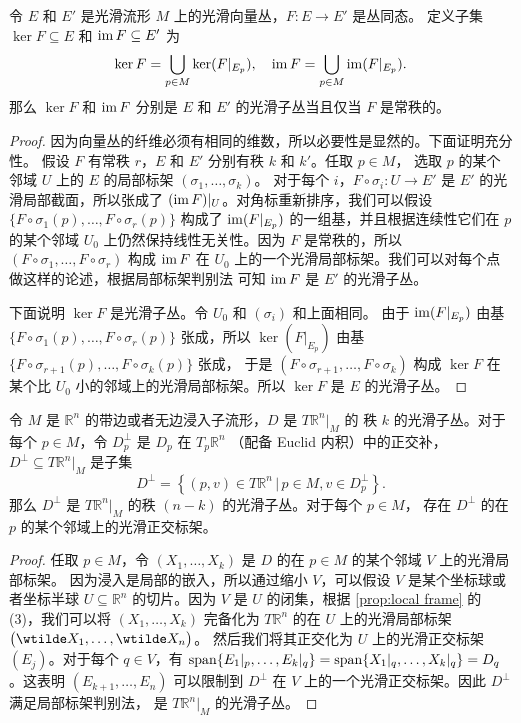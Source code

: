 \begin{theorem}
  令 $E$ 和 $E'$ 是光滑流形 $M$ 上的光滑向量丛，$F:E\to E'$ 是丛同态。
  定义子集 $\ker F\subseteq E$ 和 $\operatorname{im} F\subseteq E'$ 为
  \[
    \ker F=\bigcup_{p\in M} \ker(F|_{E_p}),\quad 
    \operatorname{im} F=\bigcup_{p\in M} \operatorname{im}(F|_{E_p}).
  \]
  那么 $\ker F$ 和 $\operatorname{im} F$ 分别是 $E$ 和 $E'$ 的光滑子丛当且仅当
  $F$ 是常秩的。
\end{theorem}
\begin{proof}
  因为向量丛的纤维必须有相同的维数，所以必要性是显然的。下面证明充分性。
  假设 $F$ 有常秩 $r$，$E$ 和 $E'$ 分别有秩 $k$ 和 $k'$。任取 $p\in M$，
  选取 $p$ 的某个邻域 $U$ 上的 $E$ 的局部标架 $(\sigma_1,\dots,\sigma_k)$。
  对于每个 $i$，$F\circ\sigma_i:U\to E'$ 是 $E'$ 的光滑局部截面，所以张成了
  $(\operatorname{im} F)|_U$。对角标重新排序，我们可以假设 $\bigl\{F\circ \sigma_1(p),\dots,F\circ\sigma_r(p)\bigr\}$
  构成了 $\operatorname{im} (F|_{E_p})$ 的一组基，并且根据连续性它们在 $p$ 的某个邻域
  $U_0$ 上仍然保持线性无关性。因为 $F$ 是常秩的，所以
  $(F\circ\sigma_1,\dots,F\circ\sigma_r)$ 构成 $\operatorname{im} F$ 在 $U_0$
  上的一个光滑局部标架。我们可以对每个点做这样的论述，根据局部标架判别法
  可知 $\operatorname{im} F$ 是 $E'$ 的光滑子丛。

  下面说明 $\ker F$ 是光滑子丛。令 $U_0$ 和 $(\sigma_i)$ 和上面相同。
  由于 $\operatorname{im} (F|_{E_p})$ 由基 $\bigl\{F\circ \sigma_1(p),\dots,F\circ\sigma_r(p)\bigr\}$
  张成，所以 $\ker(F|_{E_p})$ 由基 $\bigl\{F\circ \sigma_{r+1}(p),\dots,F\circ\sigma_k(p)\bigr\}$ 张成，
  于是 $(F\circ\sigma_{r+1},\dots,F\circ\sigma_k)$ 构成 $\ker F$
  在某个比 $U_0$ 小的邻域上的光滑局部标架。所以 $\ker F$
  是 $E$ 的光滑子丛。
\end{proof}

\begin{lemma}[正交补丛]
  令 $M$ 是 $\mathbb{R}^n$ 的带边或者无边浸入子流形，$D$ 是 $T\mathbb R^n|_M$ 的
  秩 $k$ 的光滑子丛。对于每个 $p\in M$，令 $D_p^\bot$ 是 $D_p$ 在 $T_p \mathbb{R}^n$
  （配备 Euclid 内积）中的正交补，$D^\bot\subseteq T \mathbb{R}^n|_M$ 是子集
  \[
    D^\bot=\left\{(p,v)\in T \mathbb{R}^n\,|\, p\in M, v\in D_p^\bot\right\}.
  \] 
  那么 $D^\bot$ 是 $T \mathbb{R}^n|_M$ 的秩 $(n-k)$ 的光滑子丛。对于每个 $p\in M$，
  存在 $D^\bot$ 的在 $p$ 的某个邻域上的光滑正交标架。
\end{lemma}
\begin{proof}
  任取 $p\in M$，令 $(X_1,\dots,X_k)$ 是 $D$ 的在 $p\in M$ 的某个邻域 $V$ 上的光滑局部标架。
  因为浸入是局部的嵌入，所以通过缩小 $V$，可以假设 $V$ 是某个坐标球或者坐标半球 $U\subseteq \mathbb{R}^n$
  的切片。因为 $V$ 是 $U$ 的闭集，根据 \autoref{prop:local frame} 的 (3)，我们可以将
  $(X_1,\dots,X_k)$ 完备化为 $T \mathbb{R}^n$ 的在 $U$ 上的光滑局部标架 $\bigl(\wtilde X_1,\dots,\wtilde X_n\bigr)$。
  然后我们将其正交化为 $U$ 上的光滑正交标架 $(E_j)$。对于每个 $q\in V$，有
  $\operatorname{span}\{E_1|_p,\dots,E_k|_q\}=\operatorname{span}\{X_1|_q,\dots,X_k|_q\}=D_q$。这表明 $(E_{k+1},\dots,E_n)$
  可以限制到 $D^\bot$ 在 $V$ 上的一个光滑正交标架。因此 $D^\bot$ 满足局部标架判别法，
  是 $T \mathbb{R}^n|_M$ 的光滑子丛。
\end{proof}




